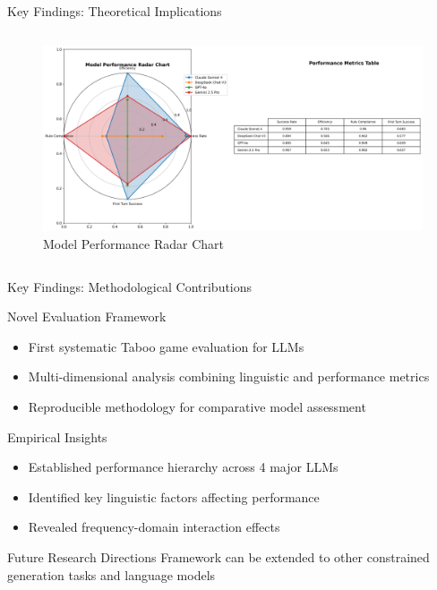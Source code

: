 \documentclass[aspectratio=169]{beamer}
\begin{document}
\begin{frame}{Key Findings: Theoretical Implications}
\begin{columns}[c]
\begin{column}{0.48\textwidth}
\begin{figure}
\includegraphics[width=\textwidth]{comprehensive_figures/figure7_radar.png}
\caption{Model Performance Radar Chart}
\end{figure}
\end{column}
\end{columns}
\end{frame}

\begin{frame}{Key Findings: Methodological Contributions}
\begin{block}{Novel Evaluation Framework}
\begin{itemize}
    \item First systematic Taboo game evaluation for LLMs
    \item Multi-dimensional analysis combining linguistic and performance metrics
    \item Reproducible methodology for comparative model assessment
\end{itemize}
\end{block}

\begin{block}{Empirical Insights}
\begin{itemize}
    \item Established performance hierarchy across 4 major LLMs
    \item Identified key linguistic factors affecting performance
    \item Revealed frequency-domain interaction effects
\end{itemize}
\end{block}

\begin{exampleblock}{Future Research Directions}
Framework can be extended to other constrained generation tasks and language models
\end{exampleblock}
\end{frame}
\end{document}
